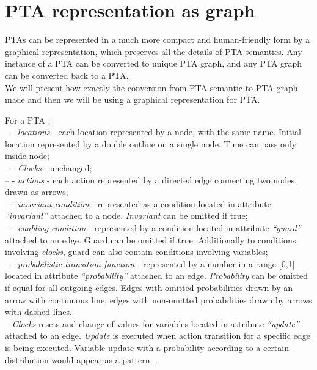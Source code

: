 \section{PTA representation as graph}
PTAs can be represented in a much more compact and human-friendly form by a graphical representation, which preserves all the details of PTA semantics. Any instance of a PTA can be converted to unique PTA graph, and any PTA graph can be converted back to a PTA.\\
We will present how exactly the conversion from PTA semantic to PTA graph made and then we will be using a graphical representation for PTA.
\par For a PTA : \\
–  - \textit{locations} - each location represented by a node, with the same name. Initial location represented by a double outline on a single node. Time can pass only inside node;\\
– - \textit{Clocks} - unchanged; \\
–  - \textit{actions} - each action represented by a directed edge connecting two nodes, drawn as arrows; \\
–  - \textit{\textit{invariant condition}} - represented as a condition located in attribute \textit{“invariant”} attached to a node. \textit{Invariant} can be omitted if true; \\
–  - \textit{enabling condition} - represented by a condition located in attribute \textit{“guard”} attached to an edge. Guard can be omitted if true. Additionally to conditions involving \textit{clocks}, guard can also contain conditions involving variables; \\
–  - \textit{\textit{probabilistic transition function}} - represented by a number in a range \small[0,1\small] located in attribute \textit{“probability”} attached to an edge. \textit{Probability} can be omitted if equal for all outgoing edges. Edges with omitted probabilities drawn by an arrow with continuous line, edges with non-omitted probabilities drawn by arrows with dashed lines. \\
– \textit{Clocks} resets and change of values for variables located in attribute \textit{“update”} attached to an edge. \textit{Update} is executed when action transition for a specific edge is being executed. Variable update with a probability according to a certain distribution would appear as a pattern: .\\
